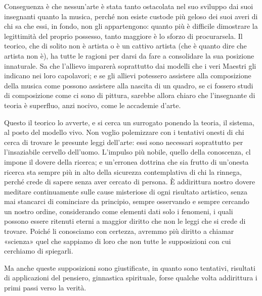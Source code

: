 Conseguenza è che nessun'arte è stata tanto ostacolata nel suo sviluppo dai suoi insegnanti quanto la musica, perché non esiste custode più geloso dei suoi averi di chi sa che essi, in fondo, non gli appartengono: quanto più è difficile dimostrare la legittimità del proprio possesso, tanto maggiore è lo sforzo di procurarsela. Il teorico, che di solito non è artista o è un cattivo artista (che è quanto dire che artista non è), ha tutte le ragioni per darsi da fare a consolidare la sua posizione innaturale. Sa che l'allievo imparerà soprattutto dai modelli che i veri Maestri gli indicano nei loro capolavori; e se gli allievi potessero assistere alla composizione della musica come possono assistere alla nascita di un quadro, se ci fossero studi di composizione come ci sono di pittura, sarebbe allora chiaro che l'insegnante di teoria è superfluo, anzi nocivo, come le accademie d'arte.

Questo il teorico lo avverte, e si cerca un surrogato ponendo la teoria, il sistema, al posto del modello vivo.
Non voglio polemizzare con i tentativi onesti di chi cerca di trovare le presunte leggi dell'arte: essi sono necessari soprattutto per l'insaziabile cervello dell'uomo. L'impulso più nobile, quello della conoscenza, cl impone il dovere della ricerca; e un'erronea dottrina che sia frutto di un'onesta ricerca sta sempre più in alto della sicurezza contemplativa di chi la rinnega, perché crede di sapere senza aver cercato di persona. È addirittura nostro dovere meditare continuamente sulle cause misteriose di ogni risultato artistico, senza mai stancarci di cominciare da principio, sempre osservando e sempre cercando un nostro ordine, considerando come elementi dati solo i fenomeni, i quali possono essere ritenuti eterni a maggior diritto che non le leggi che si crede di trovare. Poiché li conosciamo con certezza, avremmo più diritto a chiamar «scienza» quel che sappiamo di loro che non tutte le supposizioni con cui cerchiamo di spiegarli.

Ma anche queste supposizioni sono giustificate, in quanto sono tentativi, risultati di applicazioni del pensiero, ginnastica spirituale, forse qualche volta addirittura i primi passi verso la verità.

